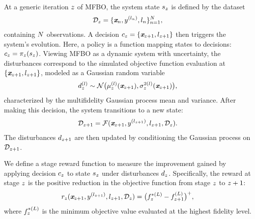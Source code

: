 At a generic iteration \(z\) of MFBO, the system state \(s_{z}\) is defined by the dataset
\[
	\mathcal{D}_{z} = \{ \textbf{\em x}_{n}, y^{(l_{n})}, l_{n} \}_{n=1}^{N},
\]
containing \(N\) observations. A decision \(c_{z} = \{ \textbf{\em x}_{z+1}, l_{z+1} \}\) then triggers the system's evolution. Here, a policy is a function mapping states to decisions: \(c_{z} = \pi_{z}(s_{z})\). Viewing MFBO as a dynamic system with uncertainty, the disturbances correspond to the simulated objective function evaluation at \(\{\textbf{\em x}_{z+1}, l_{z+1}\}\), modeled as a Gaussian random variable
\[
	d_{z}^{(l)} \sim \mathcal{N} \big( \mu_{z}^{(l)} (\textbf{\em x}_{z+1}), \sigma_{z}^{2(l)} (\textbf{\em x}_{z+1}) \big),
\]
characterized by the multifidelity Gaussian process mean and variance. After making this decision, the system transitions to a new state:
\begin{equation} \label{e:2LookMFAF1}
	\mathcal{D}_{z+1} = \mathcal{F}(\textbf{\em x}_{z+1}, y^{(l_{z+1})}, l_{z+1}, \mathcal{D}_{z}).
\end{equation}
The disturbances \(d_{z+1}\) are then updated by conditioning the Gaussian process on \(\mathcal{D}_{z+1}\).

We define a stage reward function to measure the improvement gained by applying decision \(c_{z}\) to state \(s_{z}\) under disturbances \(d_{z}\). Specifically, the reward at stage \(z\) is the positive reduction in the objective function from stage \(z\) to \(z+1\):
\begin{equation}\label{e:2LookMFAF2}
	r_{z}(\textbf{\em x}_{z+1}, y^{(l_{z+1})}, l_{z+1}, \mathcal{D}_{z}) = \big( f_{z}^{*(L)} - f_{z+1}^{(L)} \big)^+,
\end{equation}
where \(f_{z}^{*(L)}\) is the minimum objective value evaluated at the highest fidelity level.

